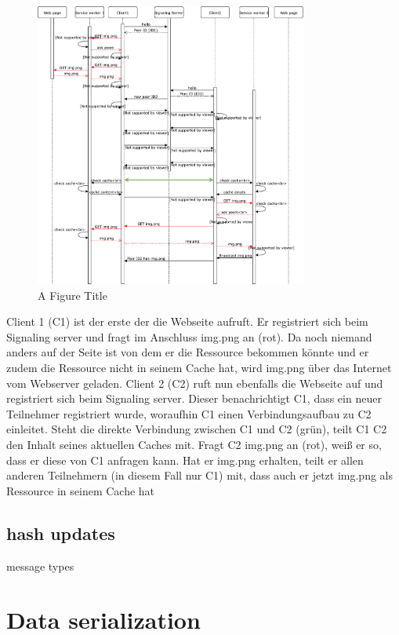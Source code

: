 \begin{figure}[!h]
	\centering
	\includegraphics[width=0.8\textwidth]{figures/SequenceDiagram}
	\caption[A Figure Short-Title]{A Figure Title}
	\label{fig:sequenceDiagram}
\end{figure}

Client 1 (C1) ist der erste der die Webseite aufruft. Er registriert sich beim Signaling server und fragt im Anschluss img.png an (rot). Da noch niemand anders auf der Seite ist von dem er die Ressource bekommen könnte und er zudem die Ressource nicht in seinem Cache hat, wird img.png über das Internet vom Webserver geladen. Client 2 (C2) ruft nun ebenfalls die Webseite auf und registriert sich beim Signaling server. Dieser benachrichtigt C1, dass ein neuer Teilnehmer registriert wurde, woraufhin C1 einen Verbindungsaufbau zu C2 einleitet. Steht die direkte Verbindung zwischen C1 und C2 (grün), teilt C1 C2 den Inhalt seines aktuellen Caches mit. Fragt C2 img.png an (rot), weiß er so, dass er diese von C1 anfragen kann. Hat er img.png erhalten, teilt er allen anderen Teilnehmern (in diesem Fall nur C1) mit, dass auch er jetzt img.png als Ressource in seinem Cache hat

\subsection{hash updates}
message types
\section{Data serialization}

